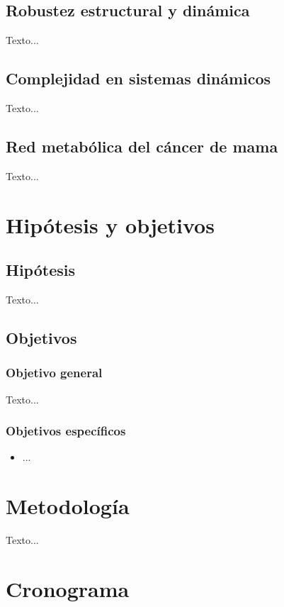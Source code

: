 \documentclass[12pt,spanish]{report}
\begin{document}
	\section{Robustez estructural y dinámica}
	Texto...
	
	\section{Complejidad en sistemas dinámicos}
	Texto...
	
	\section{Red metabólica del cáncer de mama}
	Texto...
	
	\chapter{Hipótesis y objetivos}
	
	\section{Hipótesis}
	Texto...
	
	\section{Objetivos}
	\subsection{Objetivo general}
	Texto...
	
	\subsection{Objetivos específicos}
	\begin{itemize}
		\item ...
	\end{itemize}
	
	\chapter{Metodología}
	Texto...
	
	\chapter{Cronograma}
	
\end{document}
